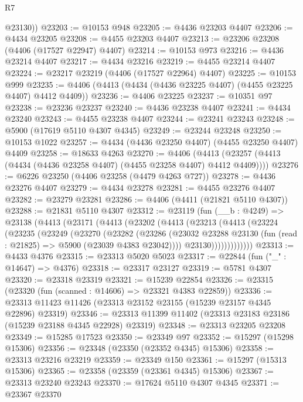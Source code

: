 \begin{lexlean}{R7}
\begin{coremodule}
        @23130))
@23203 := @10153 @948
@23205 := @4436 @23203 @4407
@23206 := @4434 @23205
@23208 := @4455 @23203 @4407
@23213 := @23206 @23208 (@4406 (@17527 @22947) @4407)
@23214 := @10153 @973
@23216 := @4436 @23214 @4407
@23217 := @4434 @23216
@23219 := @4455 @23214 @4407
@23224 := @23217 @23219 (@4406 (@17527 @22964) @4407)
@23225 := @10153 @999
@23235 := @4406 (@4413 (@4434 (@4436 @23225 @4407) (@4455 @23225 @4407) @4412 @4409))
@23236 := @4406 @23225
@23237 := @10351 @97
@23238 := @23236 @23237
@23240 := @4436 @23238 @4407
@23241 := @4434 @23240
@23243 := @4455 @23238 @4407
@23244 := @23241 @23243
@23248 := @5900 (@17619 @5110 @4307 @4345)
@23249 := @23244 @23248
@23250 := @10153 @1022
@23257 := @4434 (@4436 @23250 @4407) (@4455 @23250 @4407) @4409
@23258 := @18633 @4263
@23270 := @4406
    (@4413 (@23257 (@4413 (@4434 (@4436 @23258 @4407) (@4455 @23258 @4407) @4412 @4409))))
@23276 := @6226 @23250 (@4406 @23258 (@4479 @4263 @727))
@23278 := @4436 @23276 @4407
@23279 := @4434 @23278
@23281 := @4455 @23276 @4407
@23282 := @23279 @23281
@23286 := @4406 (@4411 (@21821 @5110 @4307))
@23288 := @21831 @5110 @4307
@23312 := @23119
    (fun (__b : @4249) =>
    @23138
      (@4413
        (@23171
          (@4413
            (@23202
              (@4413
                (@23213
                  (@4413
                    (@23224
                      (@23235
                        (@23249
                          (@23270
                            (@23282
                              (@23286
                                (@23032
                                  @23288
                                  @23130
                                  (fun (read : @21825) => @5900 (@23039 @4383 @23042))))
                              @23130)))))))))))))
@23313 := @4433 @4376
@23315 := @23313 @5020 @5023
@23317 := @22844 (fun ("_" : @14647) => @4376)
@23318 := @23317 @23127
@23319 := @5781 @4307
@23320 := @23318 @23319
@23321 := @15239 @22854
@23326 := @23315 (@23320 (fun (scanned : @14606) => @23321 @4383 @22859))
@23336 := @23313 @11423 @11426 (@23313 @23152 @23155 (@15239 @23157 @4345 @22896) @23319)
@23346 := @23313 @11399 @11402 (@23313 @23183 @23186 (@15239 @23188 @4345 @22928) @23319)
@23348 := @23313 @23205 @23208
@23349 := @15285 @17523
@23350 := @23349 @97
@23352 := @15297 (@15298 @15306)
@23356 := @23348 (@23350 (@23352 @4345) @15306)
@23358 := @23313 @23216 @23219
@23359 := @23349 @150
@23361 := @15297 (@15313 @15306)
@23365 := @23358 (@23359 (@23361 @4345) @15306)
@23367 := @23313 @23240 @23243
@23370 := @17624 @5110 @4307 @4345
@23371 := @23367 @23370

\end{coremodule}
\end{lexlean}
